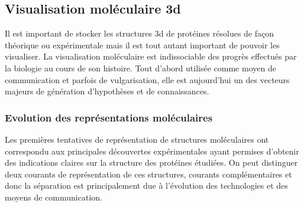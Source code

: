 \subsection{Visualisation moléculaire 3d} \label{visu_molecular}

Il est important de stocker les structures 3d de protéines résolues de façon théorique ou expérimentale mais il est tout autant important de pouvoir les visualiser. La visualisation moléculaire est indissociable des progrès effectués par la biologie au cours de son histoire. Tout d'abord utilisée comme moyen de communication et parfois de vulgarisation, elle est aujourd'hui un des vecteurs majeurs de génération d'hypothèses et de connaissances.

\subsubsection{Evolution des représentations moléculaires}

Les premières tentatives de représentation de structures moléculaires ont correspondu aux principales découvertes expérimentales ayant permises d'obtenir des indications claires sur la structure des protéines étudiées. On peut distinguer deux courants de représentation de ces structures, courants complémentaires et donc la séparation est principalement due à l'évolution des technologies et des moyens de communication.

